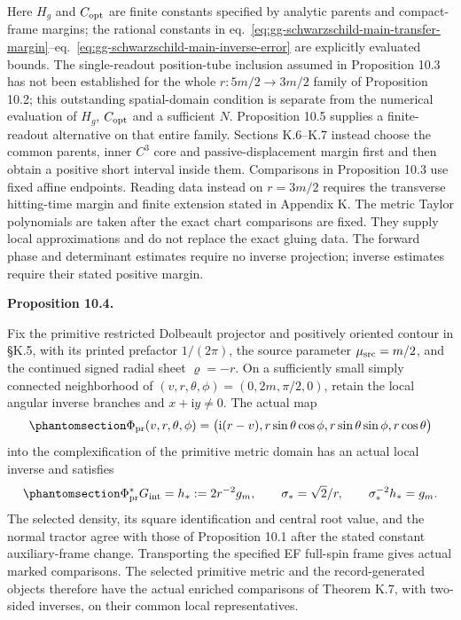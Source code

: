 \documentclass[
  english,
  11pt,
  reqno]{amsart}
\makeatletter
\newcommand{\pandocstatementheading}[1]{%
  \par\addpenalty{\@beginparpenalty}%
  \addvspace{.5\baselineskip plus .2\baselineskip minus .2\baselineskip}%
  {\normalfont\bfseries #1\par}%
  \nobreak\@afterindenttrue\@afterheading
}
\makeatother
\begin{document}
Here \(H_g\) and \(C_{\rm opt}\) are finite constants specified by
analytic parents and compact-frame margins; the rational constants in
eq.~\ref{eq:gg-schwarzschild-main-transfer-margin}--eq.~\ref{eq:gg-schwarzschild-main-inverse-error}
are explicitly evaluated bounds. The single-readout position-tube
inclusion assumed in Proposition 10.3 has not been established for the
whole \(r:5m/2\to3m/2\) family of Proposition 10.2; this outstanding
spatial-domain condition is separate from the numerical evaluation of
\(H_g\), \(C_{\rm opt}\) and a sufficient \(N\). Proposition 10.5
supplies a finite-readout alternative on that entire family. Sections
K.6--K.7 instead choose the common parents, inner \(C^3\) core and
passive-displacement margin first and then obtain a positive short
interval inside them. Comparisons in Proposition 10.3 use fixed affine
endpoints. Reading data instead on \(r=3m/2\) requires the transverse
hitting-time margin and finite extension stated in Appendix K. The
metric Taylor polynomials are taken after the exact chart comparisons
are fixed. They supply local approximations and do not replace the exact
gluing data. The forward phase and determinant estimates require no
inverse projection; inverse estimates require their stated positive
margin.

\pandocstatementheading{\protect{}\label{prop:gg-schwarzschild-primitive-comparison}Proposition 10.4.}

Fix the primitive restricted Dolbeault projector and positively oriented
contour in §K.5, with its printed prefactor \(1/(2\pi)\), the source
parameter \(\mu_{\rm src}=m/2\), and the continued signed radial sheet
\(\varrho=-r\). On a sufficiently small simply connected neighborhood of
\((v,r,\theta,\phi)=(0,2m,\pi/2,0)\), retain the local angular inverse
branches and \(x+\mathrm iy\ne0\). The actual map
\begin{equation}\protect\phantomsection\label{eq:gg-schwarzschild-primitive-map}{
 \Phi_{\rm pr}(v,r,\theta,\phi)
 =\bigl(\mathrm i(r-v),r\sin\theta\cos\phi,
                   r\sin\theta\sin\phi,r\cos\theta\bigr)
}\end{equation} into the complexification of the primitive metric domain
has an actual local inverse and satisfies
\begin{equation}\protect\phantomsection\label{eq:gg-schwarzschild-primitive-identity}{
 \Phi_{\rm pr}^*G_{\rm int}=h_*:=2r^{-2}g_m,\qquad
 \sigma_*=\sqrt2/r,\qquad \sigma_*^{-2}h_*=g_m.
}\end{equation} The selected density, its square identification and
central root value, and the normal tractor agree with those of
Proposition 10.1 after the stated constant auxiliary-frame change.
Transporting the specified EF full-spin frame gives actual marked
comparisons. The selected primitive metric and the record-generated
objects therefore have the actual enriched comparisons of Theorem K.7,
with two-sided inverses, on their common local representatives.
\end{document}

